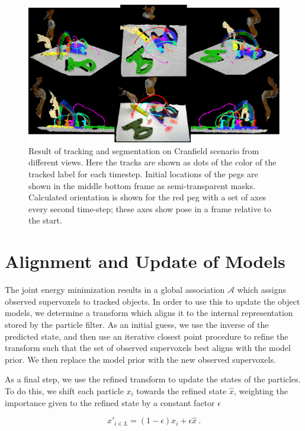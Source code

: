 \begin{figure}[!ht]
  \centering
  \includegraphics[width=\linewidth]{figures/IROS2013/TrajectoriesNew.pdf}
  \caption[Cranfield Tracking Results]{Result of tracking and segmentation on Cranfield scenario from different views. Here the tracks are shown as dots of the color of the tracked label for each timestep. Initial locations of the pegs are shown in the middle bottom frame as semi-transparent masks. Calculated orientation is shown for the red peg with a set of axes every second time-step; these axes show pose in a frame relative to the start. }
  \label{fig:Trajectories}
\end{figure}

\section{Alignment and Update of Models}
The joint energy minimization results in a global association $\mathcal{A}$ which assigns observed supervoxels to tracked objects. In order to use this to update the object models, we determine a transform which aligns it to the internal representation stored by the particle filter. As an initial guess, we use the inverse of the predicted state, and then use an iterative closest point \cite{ICPChetverikov} procedure to refine the transform such that the set of observed supervoxels best aligns with the model prior. We then replace the model prior with the new observed supervoxels. 

As a final step, we use the refined transform to update the states of the particles. To do this, we shift each particle $x_i$ towards the refined state $\hat{x}$, weighting the importance given to the refined state by a constant factor $\epsilon$

\begin{equation}
\label{eqn:PFUpdate}
x'_{i \in L} = (1-\epsilon) x_i + \epsilon \hat{x}~.
\end{equation}


